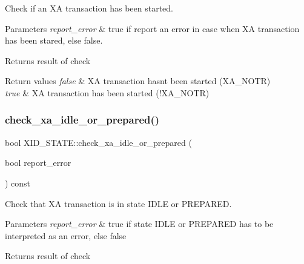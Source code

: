 Check if an XA transaction has been started.


\begin{DoxyParams}{Parameters}
{\em report\+\_\+error} & true if report an error in case when XA transaction has been stared, else false.\\
\hline
\end{DoxyParams}
\begin{DoxyReturn}{Returns}
result of check 
\end{DoxyReturn}

\begin{DoxyRetVals}{Return values}
{\em false} & XA transaction hasn\textquotesingle{}t been started (X\+A\+\_\+\+N\+O\+TR) \\
\hline
{\em true} & XA transaction has been started (!\+X\+A\+\_\+\+N\+O\+TR) \\
\hline
\end{DoxyRetVals}
\mbox{\label{classXID__STATE_a6b29731f4de0b55da2c33ffceea49506}} 
\subsubsection{\texorpdfstring{check\+\_\+xa\+\_\+idle\+\_\+or\+\_\+prepared()}{check\_xa\_idle\_or\_prepared()}}
{\footnotesize\ttfamily bool X\+I\+D\+\_\+\+S\+T\+A\+T\+E\+::check\+\_\+xa\+\_\+idle\+\_\+or\+\_\+prepared (\begin{DoxyParamCaption}\item[{bool}]{report\+\_\+error }\end{DoxyParamCaption}) const}

Check that XA transaction is in state I\+D\+LE or P\+R\+E\+P\+A\+R\+ED.


\begin{DoxyParams}{Parameters}
{\em report\+\_\+error} & true if state I\+D\+LE or P\+R\+E\+P\+A\+R\+ED has to be interpreted as an error, else false\\
\hline
\end{DoxyParams}
\begin{DoxyReturn}{Returns}
result of check 
\end{DoxyReturn}

